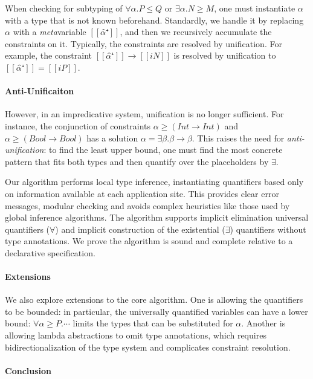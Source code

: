 \documentclass[sigplan,natbib=false,screen]{acmart}
\begin{document}
When checking for subtyping of $\forall\alpha.P \leqslant Q$
or $\exists\alpha.N \geqslant M$, one must instantiate
$\alpha$ with a type that is not known beforehand. 
Standardly, we handle it by replacing $\alpha$ with a 
\emph{meta}variable $[[α̂⁺]]$, and then we recursively accumulate the 
constraints on it. Typically, the constraints are resolved by unification.
For example, the constraint $[[α̂⁺]]\rightarrow[[iN]]$ is resolved by 
unification to $[[α̂⁺]] = [[iP]]$.


\paragraph{Anti-Unificaiton}
However, in an impredicative system, unification is no longer sufficient.    
For instance, the conjunction of constraints 
$\alpha \geqslant (Int \rightarrow  Int)$ and $\alpha \geqslant (Bool \rightarrow Bool)$
has a solution $\alpha = \exists \beta. \beta \rightarrow \beta$.
This raises the need for \emph{anti-unification}: to find the least upper bound, 
one must find the most concrete pattern that fits both types and then 
quantify over the placeholders by $\exists$.

Our algorithm performs local type inference, instantiating quantifiers based
only on information available at each application site. This provides clear
error messages, modular checking and avoids complex heuristics like those used
by global inference algorithms. The algorithm supports implicit
elimination universal quantifiers ($\forall$) and implicit construction of the 
existential ($\exists$) quantifiers without type annotations. 
We prove the algorithm is sound and complete relative to a declarative specification. 


\paragraph{Extensions}

We also explore extensions to the core algorithm.
One is allowing the quantifiers to be bounded: in particular, 
the universally quantified variables can have 
a lower bound: $\forall \alpha \geqslant P. \cdots$ 
limits the types that can be substituted for $\alpha$.
Another is allowing lambda abstractions to omit type annotations,
which requires bidirectionalization of the type system
and complicates constraint resolution. 

\paragraph{Conclusion}
\end{document}
